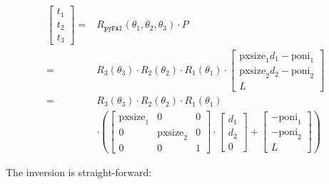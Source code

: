 \documentclass[12pt]{article}
\begin{document}
\begin{align}
  \begin{bmatrix} t_1 \\ t_2 \\ t_3 \end{bmatrix}
  = &
  R_{\mathtt{pyFAI}}(\theta_1, \theta_2, \theta_3) \cdot P
  \\
  = &
  R_3(\theta_3) \cdot R_2(\theta_2) \cdot R_1(\theta_1) \cdot
  \begin{bmatrix}
    \mathrm{pxsize}_1 d_1 - \mathrm{poni}_1 \\
    \mathrm{pxsize}_2 d_2 - \mathrm{poni}_2 \\
    L
  \end{bmatrix}
  \\
  = &
  R_3(\theta_3) \cdot R_2(\theta_2) \cdot R_1(\theta_1)
  \nonumber \\ &
  \cdot
  \left(
  \begin{bmatrix}
    \mathrm{pxsize}_1 & 0 & 0 \\
    0 & \mathrm{pxsize}_2 & 0 \\
    0 & 0 & 1
  \end{bmatrix}
  \cdot
  \begin{bmatrix}
    d_1 \\
    d_2 \\
    0
  \end{bmatrix}
  +
  \begin{bmatrix}
    - \mathrm{poni}_1 \\
    - \mathrm{poni}_2 \\
    L
  \end{bmatrix}
  \right)
  \label{eq-tpyFAI}
\end{align}

The inversion is straight-forward:
\end{document}
